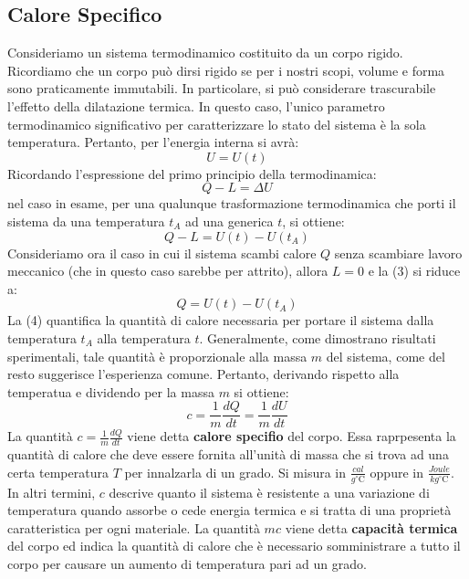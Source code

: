 \subsection{Calore Specifico}
Consideriamo un sistema termodinamico costituito da un corpo rigido. Ricordiamo che un corpo può dirsi rigido se per i nostri scopi, volume e forma sono praticamente immutabili. In particolare, si può considerare trascurabile l'effetto della dilatazione termica. In questo caso, l'unico parametro termodinamico significativo per caratterizzare lo stato del sistema è la sola temperatura. Pertanto, per l'energia interna si avrà:
\begin{equation}
    U = U(t)
\end{equation}
Ricordando l'espressione del primo principio della termodinamica:
\begin{equation}
    Q -L = \Delta U 
\end{equation}
nel caso in esame, per una qualunque trasformazione termodinamica che porti il sistema da una temperatura $t_A$ ad una generica $t$, si ottiene:
\begin{equation}
    Q - L = U(t) - U(t_A)
\end{equation}
Consideriamo ora il caso in cui il sistema scambi calore $Q$ senza scambiare lavoro meccanico (che in questo caso sarebbe per attrito), allora $L = 0$ e la (3) si riduce a:
\begin{equation}
    Q = U(t) - U(t_A)
\end{equation}
La (4) quantifica la quantità di calore necessaria per portare il sistema dalla temperatura $t_A$ alla temperatura $t$. Generalmente, come dimostrano risultati sperimentali, tale quantità è proporzionale alla massa $m$ del sistema, come del resto suggerisce l'esperienza comune. Pertanto, derivando rispetto alla temperatua e dividendo per la massa $m$ si ottiene:
\begin{equation}
    c = \frac{1}{m}\frac{dQ}{dt} = \frac{1}{m}\frac{dU}{dt}
\end{equation}
La quantità $c = \frac{1}{m}\frac{dQ}{dt}$ viene detta \textbf{calore specifio} del corpo. Essa raprpesenta la quantità di calore che deve essere fornita all'unità di massa che si trova ad una certa temperatura $T$ per innalzarla di un grado. Si misura in $\frac{cal}{g^\circ \mathrm{C}}$ oppure in $\frac{Joule}{kg^\circ \mathrm{C}}$. In altri termini, $c$ descrive quanto il sistema è resistente a una variazione di temperatura quando assorbe o cede energia termica e si tratta di una proprietà caratteristica per ogni materiale. La quantità $mc$ viene detta \textbf{capacità termica} del corpo ed indica la quantità di calore che è necessario somministrare a tutto il corpo per causare un aumento di temperatura pari ad un grado.

